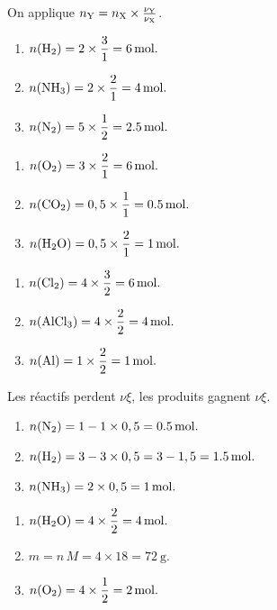 \documentclass[11pt,a4paper]{article}
\begin{document}
\begin{corrige}
On applique $n_{\ce{Y}}=n_{\ce{X}}\times\frac{\nu_{\ce{Y}}}{\nu_{\ce{X}}}$.
\begin{enumerate}[label=\alph*)]
  \item $n(\ce{H2})=2\times\dfrac{3}{1}=\qty{6}{\mole}.$
  \item $n(\ce{NH3})=2\times\dfrac{2}{1}=\qty{4}{\mole}.$
  \item $n(\ce{N2})=5\times\dfrac{1}{2}=\qty{2.5}{\mole}.$
\end{enumerate}
\end{corrige}

\begin{corrige}
\begin{enumerate}[label=\alph*)]
  \item $n(\ce{O2})=3\times\dfrac{2}{1}=\qty{6}{\mole}.$
  \item $n(\ce{CO2})=0,5\times\dfrac{1}{1}=\qty{0.5}{\mole}.$
  \item $n(\ce{H2O})=0,5\times\dfrac{2}{1}=\qty{1}{\mole}.$
\end{enumerate}
\end{corrige}

\begin{corrige}
\begin{enumerate}[label=\alph*)]
  \item $n(\ce{Cl2})=4\times\dfrac{3}{2}=\qty{6}{\mole}.$
  \item $n(\ce{AlCl3})=4\times\dfrac{2}{2}=\qty{4}{\mole}.$
  \item $n(\ce{Al})=1\times\dfrac{2}{2}=\qty{1}{\mole}.$
\end{enumerate}
\end{corrige}

\begin{corrige}
Les réactifs perdent $\nu\xi$, les produits gagnent $\nu\xi$.
\begin{enumerate}[label=\alph*)]
  \item $n(\ce{N2})=1-1\times0,5=\qty{0.5}{\mole}.$
  \item $n(\ce{H2})=3-3\times0,5=3-1,5=\qty{1.5}{\mole}.$
  \item $n(\ce{NH3})=2\times0,5=\qty{1}{\mole}.$
\end{enumerate}
\end{corrige}

\begin{corrige}
\begin{enumerate}[label=\alph*)]
  \item $n(\ce{H2O})=4\times\dfrac{2}{2}=\qty{4}{\mole}.$
  \item $m=n\,M=4\times18=\qty{72}{\gram}.$
  \item $n(\ce{O2})=4\times\dfrac{1}{2}=\qty{2}{\mole}.$
\end{enumerate}
\end{corrige}
\end{document}
